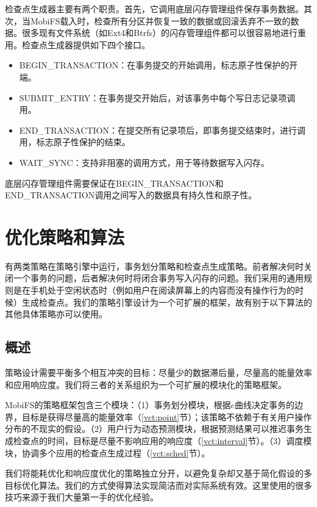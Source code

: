 检查点生成器主要有两个职责。首先，它调用底层闪存管理组件保存事务数据。其次，当MobiFS载入时，检查所有分区并恢复一致的数据或回滚丢弃不一致的数据。很多现有文件系统（如Ext4和Btrfs）的闪存管理组件都可以很容易地进行重用。检查点生成器提供如下四个接口。 

\begin{itemize}
\item BEGIN\_TRANSACTION：在事务提交的开始调用，标志原子性保护的开端。 
\item SUBMIT\_ENTRY：在事务提交开始后，对该事务中每个写日志记录项调用。 
\item END\_TRANSACTION：在提交所有记录项后，即事务提交结束时，进行调用，标志原子性保护的结束。 
\item WAIT\_SYNC：支持非阻塞的调用方式，用于等待数据写入闪存。 
\end{itemize}

底层闪存管理组件需要保证在BEGIN\_TRANSACTION和END\_TRANSACTION调用之间写入的数据具有持久性和原子性。 

\section{优化策略和算法}

有两类策略在策略引擎中运行，事务划分策略和检查点生成策略。前者解决何时关闭一个事务的问题，后者解决何时将闭合事务写入闪存的问题。我们采用的通用规则是在手机处于空闲状态时（例如用户在阅读屏幕上的内容而没有操作行为的时候）生成检查点。我们的策略引擎设计为一个可扩展的框架，故有别于以下算法的其他具体策略亦可以使用。

\subsection{概述}

策略设计需要平衡多个相互冲突的目标：尽量少的数据滞后量，尽量高的能量效率和应用响应度。我们将三者的关系组织为一个可扩展的模块化的策略框架。 

MobiFS的策略框架包含三个模块：（1）事务划分模块，根据$e$曲线决定事务的边界，目标是获得尽量高的能量效率（\ref{vct:point}节）；该策略不依赖于有关用户操作分布的不现实的假设。（2）用户行为动态预测模块，根据预测结果可以推迟事务生成检查点的时间，目标是尽量不影响应用的响应度（\ref{vct:interval}节）。（3）调度模块，协调多个应用的检查点生成过程（\ref{vct:sched}节）。 
 
我们将能耗优化和响应度优化的策略独立分开，以避免复杂却又基于简化假设的多目标优化算法。我们的方式使得算法实现简洁而对实际系统有效。这里使用的很多技巧来源于我们大量第一手的优化经验。 

